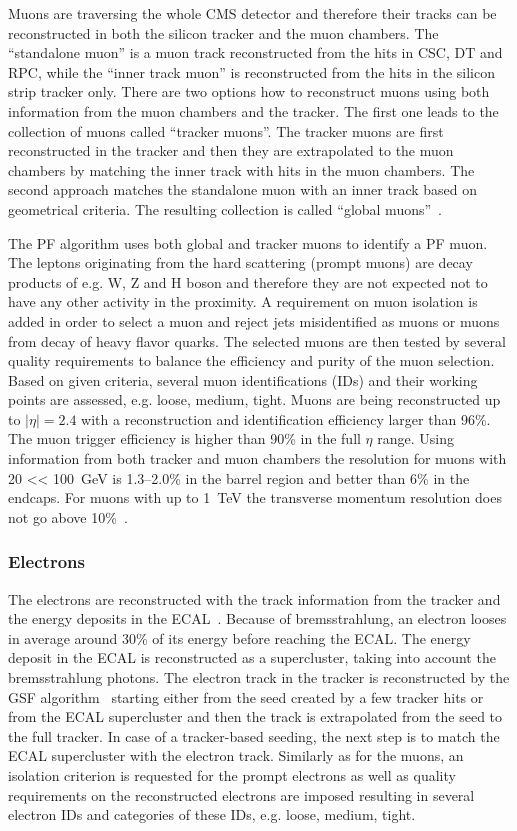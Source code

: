 Muons are traversing the whole CMS detector and therefore their tracks can be reconstructed in both the silicon tracker and the muon chambers. The ``standalone muon'' is a muon track reconstructed from the hits in CSC, DT and RPC, while the ``inner track muon'' is reconstructed from the hits in the silicon strip tracker only. There are two options how to reconstruct muons using both information from the muon chambers and the tracker. The first one leads to the collection of muons called ``tracker muons''.  The tracker muons are first reconstructed in the tracker and then they are extrapolated to the muon chambers by matching the inner track with hits in the muon chambers. The second approach matches the standalone muon with an inner track based on geometrical criteria. The resulting collection is called ``global muons''~\cite{Chatrchyan:2012xi}. 

The PF algorithm uses both global and tracker muons to identify a PF muon. The leptons originating from the hard scattering (prompt muons)  are decay products of e.g. W, Z and H boson and therefore they are not expected not to have any other activity in the proximity. A requirement on muon isolation is added in order to select a muon and reject jets misidentified as muons or muons from decay of heavy flavor quarks. The selected muons are then tested by several quality requirements to balance the efficiency and purity of the muon selection. Based on given criteria, several muon identifications (IDs) and their working points are assessed, e.g. loose, medium, tight. Muons are being reconstructed up to $|\eta|=2.4$ with a reconstruction and identification efficiency larger than 96\%. The muon trigger efficiency is higher than 90\% in  the full $\eta$ range. Using information from both tracker and muon chambers the \pt resolution for muons with 20 <\pt < 100~GeV is 1.3--2.0\% in the barrel region and better than 6\% in the endcaps. For muons with \pt up to 1~TeV the transverse momentum resolution does not go above 10\%~\cite{Chatrchyan:2012xi}.

\subsubsection{Electrons}

The electrons are reconstructed with the track information from the tracker and the energy deposits in the ECAL~\cite{Khachatryan:2015hwa}. Because of bremsstrahlung, an electron looses in average around 30\% of its energy before reaching the ECAL. The energy deposit in the ECAL is reconstructed as a supercluster, taking into account the bremsstrahlung photons. The electron track in the tracker is reconstructed by the GSF algorithm~\cite{Adam:2003kg} starting either from the seed created by a few tracker hits or from the ECAL supercluster and then the track is extrapolated from the seed to the full tracker. In case of a tracker-based seeding, the next step is to match the ECAL supercluster with the electron track. Similarly as for the muons, an isolation criterion is requested for the prompt electrons as well as quality requirements on the reconstructed electrons are imposed resulting in several electron IDs and categories of these IDs, e.g. loose, medium, tight.

